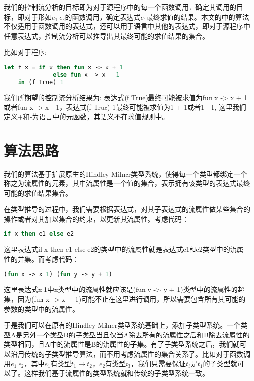 \documentclass[UTF8, colorlinks]{pkuthss}
\begin{document}
	我们的控制流分析的目标即为对于源程序中的每一个函数调用，确定其调用的目标，即对于形如$e_1\ e_2$的函数调用，确定表达式$e_1$最终求值的结果。本文的中的算法不仅适用于函数调用的表达式，还可以用于语言中其他的表达式，即对于源程序中任意表达式，控制流分析可以推导出其最终可能的求值结果的集合。
	
	比如对于程序:
	\begin{lstlisting}[language=Ocaml]
	let f x = if x then fun x -> x + 1 
			  else fun x -> x - 1 
	in (f True) 1
	\end{lstlisting}
	我们所期望的控制流分析结果为: 表达式(f True)最终可能被求值为fun x -> x + 1或者fun x -> x - 1，表达式(f True) 1最终可能被求值为1 + 1或者1 - 1, 这里我们定义+和-为语言中的元函数，其语义不在求值规则中。
	\section{算法思路}
	我们的算法基于扩展原生的Hindley-Milner类型系统，使得每一个类型都绑定一个称之为流属性的元素，其中流属性是一个值的集合，表示拥有该类型的表达式最终可能的求值结果集合。
	
	在类型推导的过程中，我们需要根据表达式，对其子表达式的流属性做某些集合的操作或者对其加以集合的约束，以更新其流属性。考虑代码：
	\begin{lstlisting}[language=Ocaml]
	if x then e1 else e2
	\end{lstlisting}
	这里表达式if x then e1 else e2的类型中的流属性就是表达式e1和e2类型中的流属性的并集。而考虑代码：
	\begin{lstlisting}[language=Ocaml]
	(fun x -> x 1) (fun y -> y + 1) 
	\end{lstlisting}
	这里表达式x 1中x类型中的流属性就应该是(fun y -> y + 1)类型中的流属性的超集，因为(fun x -> x + 1)可能不止在这里进行调用，所以需要包含所有其可能的参数的类型中的流属性。
	
	于是我们可以在原有的Hindley-Milner类型系统基础上，添加子类型系统。一个类型A是另外一个类型B的子类型当且仅当A除去所有的流属性之后和B除去流属性的类型相同，且A中的流属性是B的流属性的子集。有了子类型系统之后，我们就可以沿用传统的子类型推导算法，而不用考虑流属性的集合关系了。比如对于函数调用$e_1\ e_2$，其中$e_1$有类型$t_1\to t_2$，$e_2$有类型$t_3$，我们只需要保证$t_3$是$t_1$的子类型就可以了。这样我们基于流属性的类型系统就和传统的子类型系统一致。
	
\end{document}
